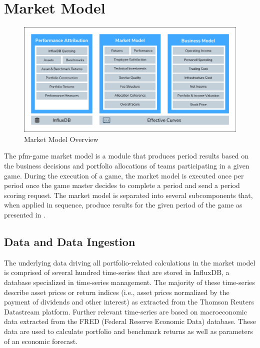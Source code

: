 \section{Market Model}
\label{sec:market_model}

\begin{figure}[h!]
    \includegraphics[width=\textwidth]{img/market_model.png}
    \caption{Market Model Overview}
    \centering
    \label{fig:market_model_overview}
\end{figure}

The pfm-game market model is a module that produces period results based on the business decisions and portfolio allocations of teams participating in a given game. During the execution of a game, the market model is executed once per period once the game master decides to complete a period and send a period scoring request. The market model is separated into several subcomponents that, when applied in sequence, produce results for the given period of the game as presented in .

\subsection{Data and Data Ingestion}
The underlying data driving all portfolio-related calculations in the market model is comprised of several hundred time-series that are stored in InfluxDB, a database specialized in time-series management. The majority of these time-series describe asset prices or return indices (i.e., asset prices normalized by the payment of dividends and other interest) as extracted from the Thomson Reuters Datastream platform. Further relevant time-series are based on macroeconomic data extracted from the FRED (Federal Reserve Economic Data) database. These data are used to calculate portfolio and benchmark returns as well as parameters of an economic forecast.\\


